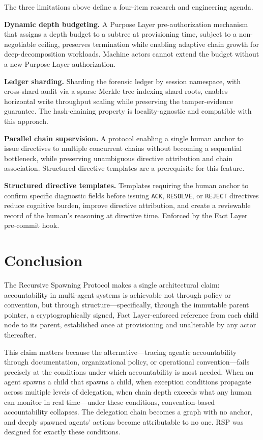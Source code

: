 The three limitations above define a four-item research and engineering agenda.

\textbf{Dynamic depth budgeting.} A Purpose Layer pre-authorization mechanism that assigns a depth budget to a subtree at provisioning time, subject to a non-negotiable ceiling, preserves termination while enabling adaptive chain growth for deep-decomposition workloads. Machine actors cannot extend the budget without a new Purpose Layer authorization.

\textbf{Ledger sharding.} Sharding the forensic ledger by session namespace, with cross-shard audit via a sparse Merkle tree indexing shard roots, enables horizontal write throughput scaling while preserving the tamper-evidence guarantee. The hash-chaining property is locality-agnostic and compatible with this approach.

\textbf{Parallel chain supervision.} A protocol enabling a single human anchor to issue directives to multiple concurrent chains without becoming a sequential bottleneck, while preserving unambiguous directive attribution and chain association. Structured directive templates are a prerequisite for this feature.

\textbf{Structured directive templates.} Templates requiring the human anchor to confirm specific diagnostic fields before issuing \texttt{ACK}, \texttt{RESOLVE}, or \texttt{REJECT} directives reduce cognitive burden, improve directive attribution, and create a reviewable record of the human's reasoning at directive time. Enforced by the Fact Layer pre-commit hook.

\section{Conclusion}
\label{sec:rs-conclusion}

The Recursive Spawning Protocol makes a single architectural claim: accountability in multi-agent systems is achievable not through policy or convention, but through structure---specifically, through the immutable parent pointer, a cryptographically signed, Fact Layer-enforced reference from each child node to its parent, established once at provisioning and unalterable by any actor thereafter.

This claim matters because the alternative---tracing agentic accountability through documentation, organizational policy, or operational convention---fails precisely at the conditions under which accountability is most needed. When an agent spawns a child that spawns a child, when exception conditions propagate across multiple levels of delegation, when chain depth exceeds what any human can monitor in real time---under these conditions, convention-based accountability collapses. The delegation chain becomes a graph with no anchor, and deeply spawned agents' actions become attributable to no one. RSP was designed for exactly these conditions.


